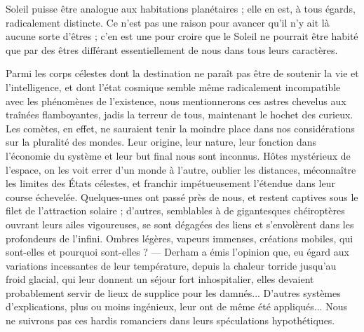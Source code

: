 \documentclass[a4paper, 11pt, oneside, landscape]{article}
\begin{document}
Soleil puisse être analogue aux habitations planétaires ; elle en est, à tous égards, radicalement distincte. Ce n'est pas une raison pour avancer qu'il n'y ait là aucune sorte d'êtres ; c'en est une pour croire que le Soleil ne pourrait être habité que par des êtres différant essentiellement de nous dans tous leurs caractères.

Parmi les corps célestes dont la destination ne paraît pas être de soutenir la vie et l'intelligence, et dont l'état cosmique semble même radicalement incompatible avec les phénomènes de l'existence, nous mentionnerons ces astres chevelus aux traînées flamboyantes, jadis la terreur de tous, maintenant le hochet des curieux. Les comètes, en effet, ne sauraient tenir la moindre place dans nos considérations sur la pluralité des mondes. Leur origine, leur nature, leur fonction dans l'économie du système et leur but final nous sont inconnus. Hôtes mystérieux de l'espace, on les voit errer d'un monde à l'autre, oublier les distances, méconnaître les limites des États célestes, et franchir impétueusement l'étendue dans leur course échevelée. Quelques-unes ont passé près de nous, et restent captives sous le filet de l'attraction solaire ; d'autres, semblables à de gigantesques chéiroptères ouvrant leurs ailes vigoureuses, se sont dégagées des liens et s'envolèrent dans les profondeurs de l'infini. Ombres légères, vapeurs immenses, créations mobiles, qui sont-elles et pourquoi sont-elles ? --- Derham a émis l'opinion que, eu égard aux variations incessantes de leur température, depuis la chaleur torride jusqu'au froid glacial, qui leur donnent un séjour fort inhospitalier, elles devaient probablement servir de lieux de supplice pour les damnés... D'autres systèmes d'explications, plus ou moins ingénieux, leur ont de même été appliqués... Nous ne suivrons pas ces hardis romanciers dans leurs spéculations hypothétiques.
\end{document}
